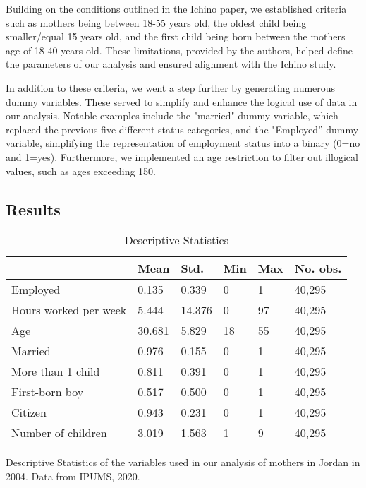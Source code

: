 \documentclass[12pt,draft,a4paper]{article}
\begin{document}
Building on the conditions outlined in the Ichino paper, we established criteria such as mothers being between 18-55 years old, 
the oldest child being smaller/equal 15 years old, and the first child being born between the mothers age of 18-40 years old. 
These limitations, provided by the authors, helped define the parameters of our analysis and ensured alignment with the Ichino study.

In addition to these criteria, we went a step further by generating numerous dummy variables. 
These served to simplify and enhance the logical use of data in our analysis. 
Notable examples include the "married" dummy variable, which replaced the previous five different status categories, 
and the "Employed” dummy variable, simplifying the representation of employment status into a binary (0=no and 1=yes). 
Furthermore, we implemented an age restriction to filter out illogical values, such as ages exceeding 150.


\subsection{Results}

\begin{table}[ht]
    \caption{Descriptive Statistics}
    \begin{tabularx}{\textwidth}{lXXXXX}
    \hline
                          & Mean   & Std.   & Min & Max & No. obs. \\ \hline
    Employed              & 0.135  & 0.339  & 0   & 1   & 40,295   \\
    Hours worked per week & 5.444  & 14.376 & 0   & 97  & 40,295   \\
    Age                   & 30.681 & 5.829  & 18  & 55  & 40,295   \\
    Married               & 0.976  & 0.155  & 0   & 1   & 40,295   \\
    More than 1 child     & 0.811  & 0.391  & 0   & 1   & 40,295   \\
    First-born boy        & 0.517  & 0.500  & 0   & 1   & 40,295   \\
    Citizen               & 0.943  & 0.231  & 0   & 1   & 40,295   \\
    Number of children    & 3.019  & 1.563  & 1   & 9   & 40,295   \\ \hline
    \end{tabularx}%

    Descriptive Statistics of the variables used in our analysis of mothers in Jordan in 2004. Data from IPUMS, 2020.
    \label{tab:desc}
    \end{table}
\end{document}
